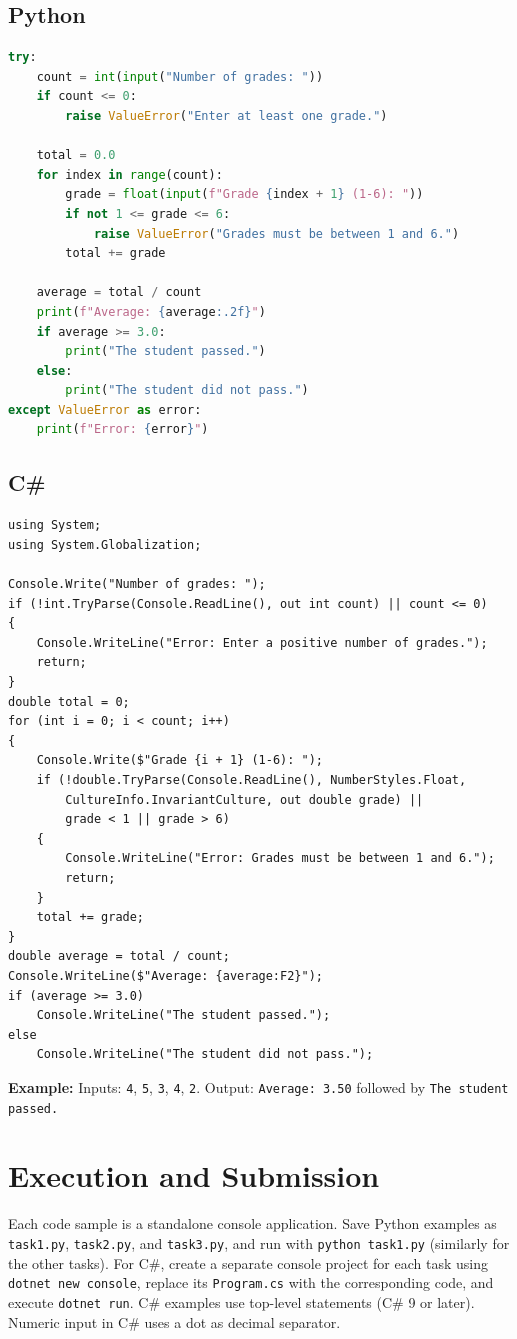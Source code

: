 \documentclass[11pt,a4paper]{article}
\begin{document}
\subsection*{Python}
\begin{lstlisting}[language=Python]
try:
    count = int(input("Number of grades: "))
    if count <= 0:
        raise ValueError("Enter at least one grade.")

    total = 0.0
    for index in range(count):
        grade = float(input(f"Grade {index + 1} (1-6): "))
        if not 1 <= grade <= 6:
            raise ValueError("Grades must be between 1 and 6.")
        total += grade

    average = total / count
    print(f"Average: {average:.2f}")
    if average >= 3.0:
        print("The student passed.")
    else:
        print("The student did not pass.")
except ValueError as error:
    print(f"Error: {error}")
\end{lstlisting}
\subsection*{C\#}
\begin{lstlisting}
using System;
using System.Globalization;

Console.Write("Number of grades: ");
if (!int.TryParse(Console.ReadLine(), out int count) || count <= 0)
{
    Console.WriteLine("Error: Enter a positive number of grades.");
    return;
}
double total = 0;
for (int i = 0; i < count; i++)
{
    Console.Write($"Grade {i + 1} (1-6): ");
    if (!double.TryParse(Console.ReadLine(), NumberStyles.Float,
        CultureInfo.InvariantCulture, out double grade) ||
        grade < 1 || grade > 6)
    {
        Console.WriteLine("Error: Grades must be between 1 and 6.");
        return;
    }
    total += grade;
}
double average = total / count;
Console.WriteLine($"Average: {average:F2}");
if (average >= 3.0)
    Console.WriteLine("The student passed.");
else
    Console.WriteLine("The student did not pass.");
\end{lstlisting}
\textbf{Example:} Inputs: \texttt{4}, \texttt{5}, \texttt{3}, \texttt{4}, \texttt{2}. Output: \texttt{Average: 3.50} followed by \texttt{The student passed.}
\section*{Execution and Submission}
Each code sample is a standalone console application. Save Python examples as \texttt{task1.py}, \texttt{task2.py}, and \texttt{task3.py}, and run with \texttt{python task1.py} (similarly for the other tasks). For C\#, create a separate console project for each task using \texttt{dotnet new console}, replace its \texttt{Program.cs} with the corresponding code, and execute \texttt{dotnet run}. C\# examples use top-level statements (C\# 9 or later). Numeric input in C\# uses a dot as decimal separator.
\end{document}
